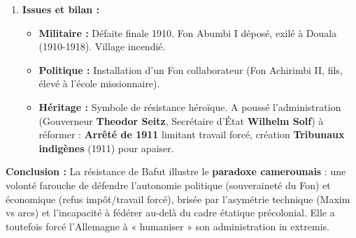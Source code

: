 \documentclass[11pt]{article}
\begin{document}
\begin{exoresolu}
\begin{enumerate}
\begin{itemize}
        \item \textbf{Moyens :} Expéditions punitives (1901, 1904, 1907, 1910). \textbf{Schutztruppe} + Askaris + porteurs réquisitionnés. Armement : \textbf{Fusils Mauser 98, Mitrailleuses Maxim, Canon de montagne 3,7 cm}.
        \item \textbf{Tactique :} « Terre brûlée » (destruction greniers, cases), prise d'otages (familles notables), blocus alimentaire.
        \item \textbf{Facteurs décisifs de l'échec Bafut :}
        \begin{enumerate}
            \item Supériorité de feu écrasante (Mitrailleuse vs Fusils à pierre/arc).
            \item Isolement diplomatique (pas d'alliance régionale solide).
            \item Usure démographique et économique (blocus, pertes humaines).
            \item Trahison / Renseignement fournis par chefferies rivales (Bali, Bamenda).
        \end{enumerate}
    \end{itemize}
    \item \textbf{Issues et bilan :}
    \begin{itemize}
        \item \textbf{Militaire :} Défaite finale 1910. Fon Abumbi I déposé, exilé à Douala (1910-1918). Village incendié.
        \item \textbf{Politique :} Installation d'un Fon collaborateur (Fon Achirimbi II, fils, élevé à l'école missionnaire).
        \item \textbf{Héritage :} Symbole de résistance héroïque. A poussé l'administration (Gouverneur \textbf{Theodor Seitz}, Secrétaire d'État \textbf{Wilhelm Solf}) à réformer : \textbf{Arrêté de 1911} limitant travail forcé, création \textbf{Tribunaux indigènes} (1911) pour apaiser.
    \end{itemize}
\end{enumerate}
\textbf{Conclusion :} La résistance de Bafut illustre le \textbf{paradoxe camerounais} : une volonté farouche de défendre l'autonomie politique (souveraineté du Fon) et économique (refus impôt/travail forcé), brisée par l'asymétrie technique (Maxim vs arcs) et l'incapacité à fédérer au-delà du cadre étatique précolonial. Elle a toutefois forcé l'Allemagne à « humaniser » son administration in extremis.
\end{exoresolu}
\end{document}
